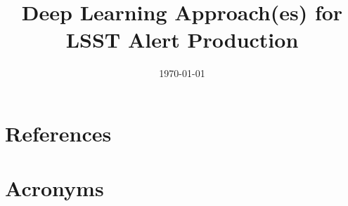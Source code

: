 \documentclass[modern]{aastex62}
\begin{document}

\date{\today}
\title{Deep Learning Approach(es) for LSST Alert Production}





\section{References} \label{sec:bib}

% 

\section{Acronyms} \label{sec:acronyms}

\end{document}
